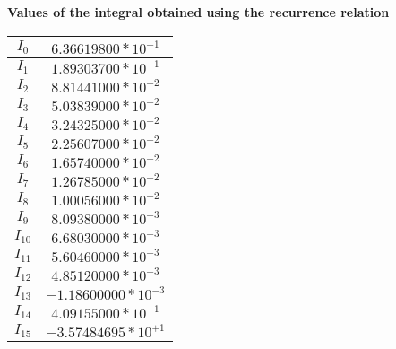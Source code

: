 \documentclass[letterpaper]{exam}
\begin{document}
\begin{questions}
\begin{parts}
\begin{solution}
\begin{center}
    \textbf{Values of the integral obtained using the recurrence relation}\\
    \begin{tabular}{|c|c|}
    \hline  
    $\textit{I}_{0}$ & $6.36619800*10^{-1}$\\
    \hline
    $\textit{I}_{1}$ & $1.89303700*10^{-1}$\\
    \hline
    $\textit{I}_{2}$ & $8.81441000*10^{-2}$\\
    \hline
    $\textit{I}_{3}$ & $5.03839000*10^{-2}$\\
    \hline
    $\textit{I}_{4}$ & $3.24325000*10^{-2}$\\
    \hline
    $\textit{I}_{5}$ & $2.25607000*10^{-2}$\\
    \hline
    $\textit{I}_{6}$ & $1.65740000*10^{-2}$\\
    \hline
    $\textit{I}_{7}$ & $1.26785000*10^{-2}$\\
    \hline
    $\textit{I}_{8}$ & $1.00056000*10^{-2}$\\
    \hline
    $\textit{I}_{9}$ & $8.09380000*10^{-3}$\\
    \hline
    $\textit{I}_{10}$ & $6.68030000*10^{-3}$\\
    \hline
    $\textit{I}_{11}$ & $5.60460000*10^{-3}$\\
    \hline
    $\textit{I}_{12}$ & $4.85120000*10^{-3}$\\
    \hline
    $\textit{I}_{13}$ & $-1.18600000*10^{-3}$\\
    \hline
    $\textit{I}_{14}$ & $4.09155000*10^{-1}$\\
    \hline
    $\textit{I}_{15}$ & $-3.57484695*10^{+1}$\\
    \hline
    \end{tabular}
\end{center}

\end{solution}

\end{parts}
\end{questions}
\end{document}
